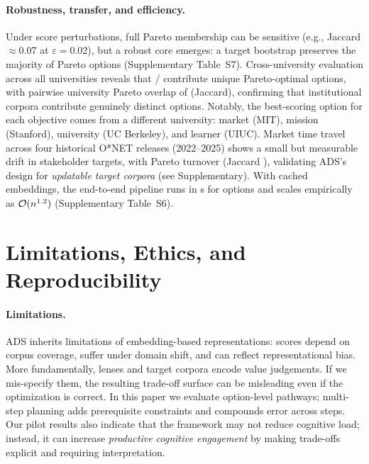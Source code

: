 \documentclass[sigconf,review]{acmart}
\newcommand{\ADS}{\textsc{ADS}\xspace}
\begin{document}
\paragraph{Robustness, transfer, and efficiency.}
Under score perturbations, full Pareto membership can be sensitive (e.g., Jaccard $\approx 0.07$ at $\varepsilon{=}0.02$), but a robust core emerges: a target bootstrap preserves the majority of Pareto options (Supplementary Table~S7). Cross-university evaluation across all {\NumUniversities} universities reveals that {\NumUnisContributing}/{\NumUniversities} contribute unique Pareto-optimal options, with pairwise university Pareto overlap of \CrossUniversityJaccard{} (Jaccard), confirming that institutional corpora contribute genuinely distinct options. Notably, the best-scoring option for each objective comes from a different university: market (MIT), mission (Stanford), university (UC Berkeley), and learner (UIUC). {Market time travel} across four historical O*NET releases (2022--2025) shows a small but measurable drift in stakeholder targets, with {\MarketDriftTurnover} Pareto turnover (Jaccard \MarketDriftJaccard), validating \ADS's design for \emph{updatable target corpora} (see Supplementary). With cached embeddings, the end-to-end pipeline runs in {\MainRuntimeSec}s for \NumCourses{} options and scales empirically as $\mathcal{O}(n^{1.2})$ (Supplementary Table~S6).



\section{Limitations, Ethics, and Reproducibility}
\label{sec:ethics}
\paragraph{Limitations.}
\ADS inherits limitations of embedding-based representations: scores depend on corpus coverage, suffer under domain shift, and can reflect representational bias. More fundamentally, lenses and target corpora encode value judgements. If we mis-specify them, the resulting trade-off surface can be misleading even if the optimization is correct. In this paper we evaluate option-level pathways; multi-step planning adds prerequisite constraints and compounds error across steps. Our pilot results also indicate that the framework may not reduce cognitive load; instead, it can increase \emph{productive cognitive engagement} by making trade-offs explicit and requiring interpretation.
\end{document}
